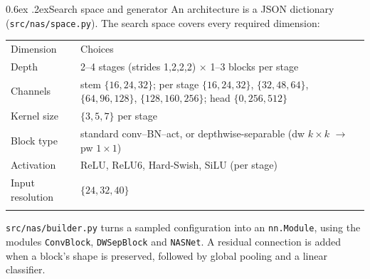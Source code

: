 \documentclass[10pt,a4paper]{article}
\makeatletter
\renewcommand\subsection{\@startsection{subsection}{2}{\z@}{-1.6ex\@plus -1ex \@minus -.2ex}%
  {0.6ex \@plus .2ex}{\normalfont\normalsize\bfseries}}
\newcommand{\toprule}{\noalign{\hrule height 0.8pt}}
\newcommand{\midrule}{\noalign{\hrule height 0.4pt}}
\newcommand{\bottomrule}{\noalign{\hrule height 0.8pt}}
\newcommand{\code}[1]{\texttt{\small #1}}
\makeatother
\begin{document}
\subsection{Search space and generator}
An architecture is a JSON dictionary (\code{src/nas/space.py}). The search space covers every
required dimension:
\begin{center}\small
\begin{tabular}{ll}
\toprule
Dimension & Choices \\
\midrule
Depth & 2--4 stages (strides 1,2,2,2) $\times$ 1--3 blocks per stage \\
Channels & stem $\{16,24,32\}$; per stage $\{16,24,32\}$, $\{32,48,64\}$, $\{64,96,128\}$, $\{128,160,256\}$; head $\{0,256,512\}$ \\
Kernel size & $\{3,5,7\}$ per stage \\
Block type & standard conv--BN--act, or depthwise-separable (dw $k{\times}k$ $\to$ pw $1{\times}1$) \\
Activation & ReLU, ReLU6, Hard-Swish, SiLU (per stage) \\
Input resolution & $\{24, 32, 40\}$ \\
\bottomrule
\end{tabular}
\end{center}
\code{src/nas/builder.py} turns a sampled configuration into an \code{nn.Module}, using the modules
\code{ConvBlock}, \code{DWSepBlock} and \code{NASNet}. A residual connection is added when a block's
shape is preserved, followed by global pooling and a linear classifier.
\end{document}
